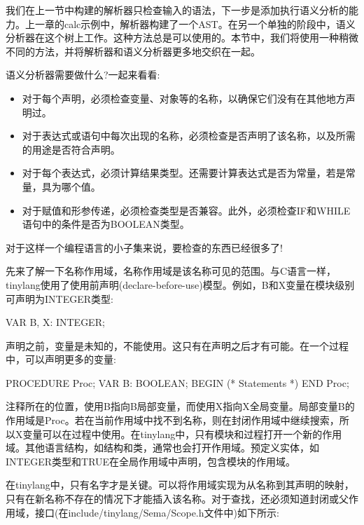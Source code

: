 
我们在上一节中构建的解析器只检查输入的语法，下一步是添加执行语义分析的能力。上一章的calc示例中，解析器构建了一个AST。在另一个单独的阶段中，语义分析器在这个树上工作。这种方法总是可以使用的。本节中，我们将使用一种稍微不同的方法，并将解析器和语义分析器更多地交织在一起。

语义分析器需要做什么?一起来看看:

\begin{itemize}
\item
对于每个声明，必须检查变量、对象等的名称，以确保它们没有在其他地方声明过。

\item
对于表达式或语句中每次出现的名称，必须检查是否声明了该名称，以及所需的用途是否符合声明。

\item
对于每个表达式，必须计算结果类型。还需要计算表达式是否为常量，若是常量，具为哪个值。

\item
对于赋值和形参传递，必须检查类型是否兼容。此外，必须检查IF和WHILE语句中的条件是否为BOOLEAN类型。
\end{itemize}

对于这样一个编程语言的小子集来说，要检查的东西已经很多了!


先来了解一下名称作用域，名称作用域是该名称可见的范围。与C语言一样，tinylang使用了使用前声明(declare-before-use)模型。例如，B和X变量在模块级别可声明为INTEGER类型:

\begin{shell}
VAR B, X: INTEGER;
\end{shell}

声明之前，变量是未知的，不能使用。这只有在声明之后才有可能。在一个过程中，可以声明更多的变量:

\begin{shell}
PROCEDURE Proc;
VAR B: BOOLEAN;
BEGIN
    (* Statements *)
END Proc;
\end{shell}

注释所在的位置，使用B指向B局部变量，而使用X指向X全局变量。局部变量B的作用域是Proc。若在当前作用域中找不到名称，则在封闭作用域中继续搜索，所以X变量可以在过程中使用。在tinylang中，只有模块和过程打开一个新的作用域。其他语言结构，如结构和类，通常也会打开作用域。预定义实体，如INTEGER类型和TRUE在全局作用域中声明，包含模块的作用域。

在tinylang中，只有名字才是关键。可以将作用域实现为从名称到其声明的映射，只有在新名称不存在的情况下才能插入该名称。对于查找，还必须知道封闭或父作用域，接口(在include/tinylang/Sema/Scope.h文件中)如下所示:

